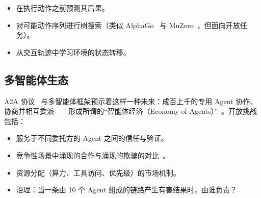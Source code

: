 \begin{itemize}
  \item 在执行动作之前预测其后果。
  \item 对可能动作序列进行树搜索（类似 AlphaGo~\cite{silver2016mastering} 与 MuZero~\cite{schrittwieser2020mastering}，但面向开放任务）。
  \item 从交互轨迹中学习环境的状态转移。
\end{itemize}

\subsection{多智能体生态}
\label{multi-agent-ecosystems}

A2A 协议~\cite{google-a2a-2025} 与多智能体框架预示着这样一种未来：成百上千的专用 Agent 协作、协商并相互委派——形成所谓的“智能体经济（Economy of Agents）”~\cite{nisan2007algorithmic}。开放挑战包括：

\begin{itemize}
  \item 服务于不同委托方的 Agent 之间的信任与验证。
  \item 竞争性场景中涌现的合作与涌现的欺骗的对比~\cite{hubinger2024sleeper}。
  \item 资源分配（算力、工具访问、优先级）的市场机制。
  \item 治理：当一条由 10 个 Agent 组成的链路产生有害结果时，由谁负责？~\cite{amodei2016concrete}
\end{itemize}

